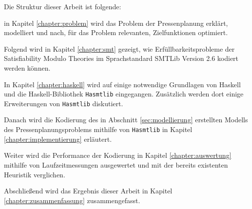 
Die Struktur dieser Arbeit ist folgende:

in Kapitel \ref{chapter:problem} wird das Problem der Pressenplanung erklärt, modelliert und nach, für das Problem relevanten, Zielfunktionen optimiert.

Folgend wird in Kapitel \ref{chapter:smt} gezeigt, wie Erfüllbarkeitsprobleme der Satisfiability Modulo Theories im Sprachstandard SMTLib Version 2.6 kodiert werden können.

In Kapitel \ref{chapter:haskell} wird auf einige notwendige Grundlagen von Haskell und die Haskell-Bibliothek \texttt{Hasmtlib} eingegangen.
Zusätzlich werden dort einige Erweiterungen von \texttt{Hasmtlib} diskutiert.

Danach wird die Kodierung des in Abschnitt \ref{sec:modellierung} erstellten Modells des Pressenplanungsproblems mithilfe von \texttt{Hasmtlib}
in Kapitel \ref{chapter:implementierung} erläutert.

Weiter wird die Performance der Kodierung in Kapitel \ref{chapter:auswertung} mithilfe von Laufzeitmessungen ausgewertet und mit der bereits existenten Heuristik verglichen.

Abschließend wird das Ergebnis dieser Arbeit in Kapitel \ref{chapter:zusammenfassung} zusammengefasst.